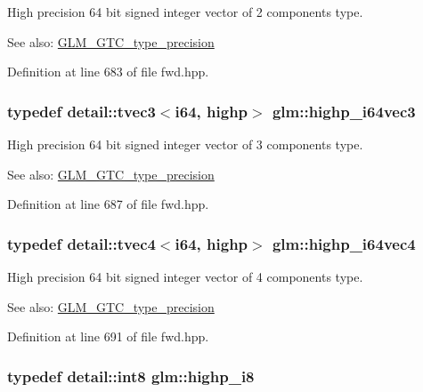 High precision 64 bit signed integer vector of 2 components type. \begin{Desc}
\item[See also:]\hyperlink{group__gtc__type__precision}{GLM\_\-GTC\_\-type\_\-precision} \end{Desc}


Definition at line 683 of file fwd.hpp.\hypertarget{group__gtc__type__precision_g4030f8ad15da56f5e427aa457d39e888}{
\subsubsection[highp\_\-i64vec3]{\setlength{\rightskip}{0pt plus 5cm}typedef detail::tvec3$<$i64, highp$>$ {\bf glm::highp\_\-i64vec3}}}
\label{group__gtc__type__precision_g4030f8ad15da56f5e427aa457d39e888}


High precision 64 bit signed integer vector of 3 components type. \begin{Desc}
\item[See also:]\hyperlink{group__gtc__type__precision}{GLM\_\-GTC\_\-type\_\-precision} \end{Desc}


Definition at line 687 of file fwd.hpp.\hypertarget{group__gtc__type__precision_g0ea279cd954fbb71a1db62e897d4d7f5}{
\subsubsection[highp\_\-i64vec4]{\setlength{\rightskip}{0pt plus 5cm}typedef detail::tvec4$<$i64, highp$>$ {\bf glm::highp\_\-i64vec4}}}
\label{group__gtc__type__precision_g0ea279cd954fbb71a1db62e897d4d7f5}


High precision 64 bit signed integer vector of 4 components type. \begin{Desc}
\item[See also:]\hyperlink{group__gtc__type__precision}{GLM\_\-GTC\_\-type\_\-precision} \end{Desc}


Definition at line 691 of file fwd.hpp.\hypertarget{group__gtc__type__precision_g8b9eb0b24cce7f14478bfcacb53ce839}{
\subsubsection[highp\_\-i8]{\setlength{\rightskip}{0pt plus 5cm}typedef detail::int8 {\bf glm::highp\_\-i8}}}
\label{group__gtc__type__precision_g8b9eb0b24cce7f14478bfcacb53ce839}


